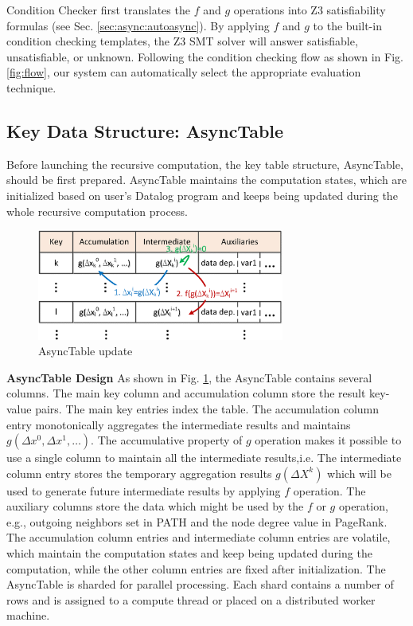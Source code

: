Condition Checker first translates the $f$ and $g$ operations into Z3 \cite{DeMoura:2008:ZES:1792734.1792766} satisfiability formulas (see Sec. \ref{sec:async:autoasync}). By applying $f$ and $g$ to the built-in condition checking templates, the Z3 SMT solver will answer satisfiable, unsatisfiable, or unknown. Following the condition checking flow as shown in Fig. \ref{fig:flow}, our system can automatically select the appropriate evaluation technique.

\subsection{Key Data Structure: AsyncTable}
\label{sec:system:data}

Before launching the recursive computation, the key table structure, AsyncTable, should be first prepared. AsyncTable maintains the computation states, which are initialized based on user's Datalog program and keeps being updated during the whole recursive computation process.

\begin{figure}[!t]
	\centering
	\includegraphics[width=3.2in]{fig/asynctable}
	\vspace{-0.0in}
	\caption{AsyncTable update}
	\label{fig:asynctable}
	\vspace{-0.0in}
\end{figure}


\noindent\textbf{AsyncTable Design}
As shown in Fig. \ref{fig:asynctable}, the AsyncTable contains several columns. The main key column and accumulation column store the result key-value pairs. The main key entries index the table. The accumulation column entry monotonically aggregates the intermediate results and maintains $g(\Delta x^0,\Delta x^1,\ldots)$. The accumulative property of $g$ operation makes it possible to use a single column to maintain all the intermediate results,i.e. The intermediate column entry stores the temporary aggregation results $g(\Delta X^k)$ which will be used to generate future intermediate results by applying $f$ operation. The auxiliary columns store the data which might be used by the $f$ or $g$ operation, e.g., outgoing neighbors set in PATH and the node degree value in PageRank. The accumulation column entries and intermediate column entries are volatile, which maintain the computation states and keep being updated during the computation, while the other column entries are fixed after initialization. The AsyncTable is sharded for parallel processing. Each shard contains a number of rows and is assigned to a compute thread or placed on a distributed worker machine.

